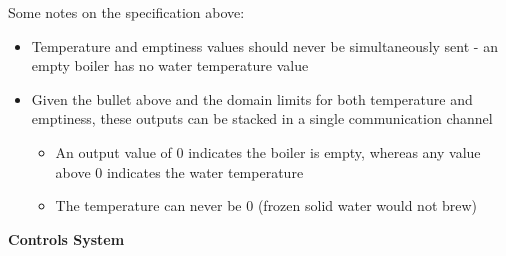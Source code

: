 \documentclass[10pt]{article}
\begin{document}
Some notes on the specification above:
\begin{itemize}
\item Temperature and emptiness values should never be simultaneously sent - an empty boiler has no water temperature value
\item Given the bullet above and the domain limits for both temperature and emptiness, these outputs can be stacked in a single communication channel
\begin{itemize}
\item An output value of 0 indicates the boiler is empty, whereas any value above 0 indicates the water temperature
\item The temperature can never be 0 (frozen solid water would not brew)
\end{itemize}
\end{itemize}


\textbf{Controls System}

\end{document}

